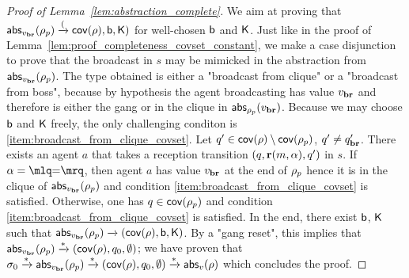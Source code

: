 \begin{proof}[Proof of Lemma~\ref{lem:abstraction_complete}]
We aim at proving that $\mathsf{abs}_{v_{\textbf{br}}}(\rho_p) \xrightarrow{(}\mathsf{cov}(\rho), \mathsf{b},\mathsf{K})$ for well-chosen $\mathsf{b}$ and $\mathsf{K}$.
Just like in the proof of Lemma~\ref{lem:proof_completeness_covset_constant}, we make a case disjunction to prove that the broadcast in $s$ may be mimicked in the abstraction from $\mathsf{abs}_{v_{\textbf{br}}}(\rho_p)$. The type obtained is either a "broadcast from clique" or a "broadcast from boss", because by hypothesis the agent broadcasting has value $v_{\textbf{br}}$ and therefore is either the gang or in the clique in $\mathsf{abs}_{\rho_p}(v_{\textbf{br}})$. Because we may choose $\mathsf{b}$ and $\mathsf{K}$ freely, the only challenging conditon is \ref{item:broadcast_from_clique_covset}.
Let $q' \in \mathsf{cov}(\rho) \setminus \mathsf{cov}(\rho_p)$, $q' \ne q_{\textbf{br}}'$. There exists an agent $a$ that takes a reception transition $(q,\textbf{r}(m, \alpha),q')$ in $s$. 
If $\anact = \quotemarks{\eqtestact}$, then agent $a$ has value $v_{\textbf{br}}$ at the end of $\rho_p$ hence it is in the clique of $\mathsf{abs}_{v_{\textbf{br}}}(\rho_p)$ and condition \ref{item:broadcast_from_clique_covset} is satisfied. Otherwise, one has $q \in \mathsf{cov}(\rho_p)$ and condition \ref{item:broadcast_from_clique_covset} is satisfied.
In the end, there exist $\mathsf{b}$, $\mathsf{K}$ such that $\mathsf{abs}_{v_{\textbf{br}}}(\rho_p) \xrightarrow{} (\mathsf{cov}(\rho), \mathsf{b},\mathsf{K})$. By a "gang reset", this implies that $\mathsf{abs}_{v_{\textbf{br}}}(\rho_p) \xrightarrow{*} (\mathsf{cov}(\rho), q_0, \emptyset)$; we have proven that $\sigma_0 \xrightarrow{*}\mathsf{abs}_{v_{\textbf{br}}}(\rho_p) \xrightarrow{*} (\mathsf{cov}(\rho), q_0, \emptyset) \xrightarrow{*} \mathsf{abs}_{v}(\rho)$ which concludes the proof. 
\end{proof}




